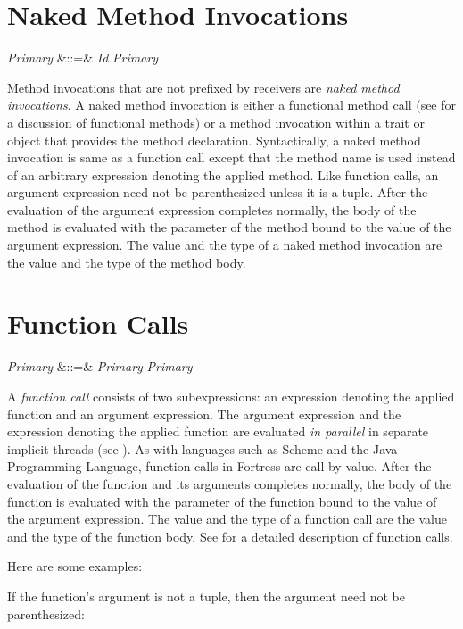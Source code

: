 %
%
%
%

\section{Naked Method Invocations}


\begin{Grammar}
\emph{Primary} &::=& \emph{Id} \emph{Primary}\\

\end{Grammar}

Method invocations that are not prefixed by receivers are \emph{naked
  method invocations}.  A naked method invocation is either a
functional method call (see  for a discussion of
functional methods) or a method invocation within a trait or object
that provides the method declaration.  Syntactically, a naked method
invocation is same as a function call except that the method name is
used instead of an arbitrary expression denoting the applied method.
Like function calls, an argument expression need not be parenthesized
unless it is a tuple.  After the evaluation of the argument expression
completes normally, the body of the method is evaluated with the parameter
of the method bound to the value of the argument expression.  The value
and the type of a naked method invocation are the value and the type
of the method body.


\section{Function Calls}


\begin{Grammar}
\emph{Primary} &::=& \emph{Primary} \emph{Primary}\\
\end{Grammar}


A \emph{function call} consists of two subexpressions: an expression
denoting the applied function and an argument expression.  The
argument expression and the expression denoting the applied function
are evaluated \emph{in parallel} in separate implicit threads (see
).  As with languages such as Scheme and
the Java Programming Language, function calls in Fortress are
call-by-value.  After the evaluation of the function and its arguments
completes normally,
the body of the function is evaluated with the parameter of the
function bound to the value of the argument expression.
The value and the type of a function call are the value and the type of
the function body.
See  for a detailed description of function calls.


Here are some examples:

If the function's argument is not a tuple, then the argument need not be
parenthesized:


